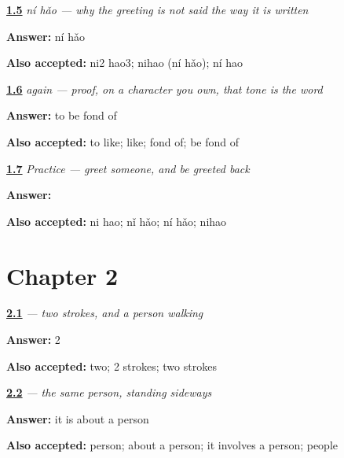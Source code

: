 \noindent\begin{minipage}[t]{\linewidth}
\raggedright
\hyperlink{review-ZH-C01-tone-sandhi-spoken}{\textbf{1.5}} \emph{ní hǎo — why the greeting is not said the way it is written}\par
\small \textbf{Answer:} ní hǎo\par
\footnotesize \textbf{Also accepted:} ni2 hao3; nihao (ní hǎo); ní hao
\end{minipage}\par\medskip

\noindent\begin{minipage}[t]{\linewidth}
\raggedright
\hyperlink{review-ZH-C01-hao-fond-tone}{\textbf{1.6}} \emph{ again — proof, on a character you own, that tone is the word}\par
\small \textbf{Answer:} to be fond of\par
\footnotesize \textbf{Also accepted:} to like; like; fond of; be fond of
\end{minipage}\par\medskip

\noindent\begin{minipage}[t]{\linewidth}
\raggedright
\hyperlink{review-ZH-C01-practice-greet}{\textbf{1.7}} \emph{Practice — greet someone, and be greeted back}\par
\small \textbf{Answer:} \par
\footnotesize \textbf{Also accepted:} ni hao; nǐ hǎo; ní hǎo; nihao
\end{minipage}\par\medskip

\section*{Chapter 2}

\noindent\begin{minipage}[t]{\linewidth}
\raggedright
\hyperlink{review-ZH-W01-ren-strokes}{\textbf{2.1}} \emph{ — two strokes, and a person walking}\par
\small \textbf{Answer:} 2\par
\footnotesize \textbf{Also accepted:} two; 2 strokes; two strokes
\end{minipage}\par\medskip

\noindent\begin{minipage}[t]{\linewidth}
\raggedright
\hyperlink{review-ZH-W01-ren-radical-meaning}{\textbf{2.2}} \emph{ — the same person, standing sideways}\par
\small \textbf{Answer:} it is about a person\par
\footnotesize \textbf{Also accepted:} person; about a person; it involves a person; people
\end{minipage}\par\medskip

